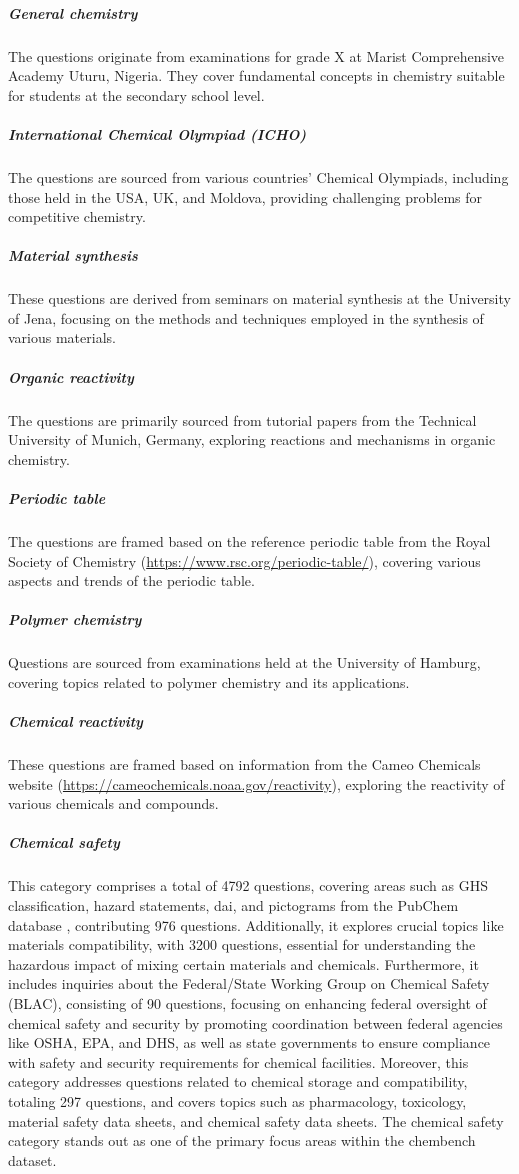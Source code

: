 \documentclass[11pt, oneside]{article}
\begin{document}
\subparagraph{General chemistry}
The questions originate from examinations for grade X at Marist Comprehensive Academy Uturu, Nigeria. They cover fundamental concepts in chemistry suitable for students at the secondary school level.

\subparagraph{International Chemical Olympiad (\gls{ICHO})}
The questions are sourced from various countries' Chemical Olympiads, including those held in the USA, UK, and Moldova, providing challenging problems for competitive chemistry.

\subparagraph{Material synthesis}
These questions are derived from seminars on material synthesis at the University of Jena, focusing on the methods and techniques employed in the synthesis of various materials.

\subparagraph{Organic reactivity}
The questions are primarily sourced from tutorial papers from the Technical University of Munich, Germany, exploring reactions and mechanisms in organic chemistry.

\subparagraph{Periodic table}
The questions are framed based on the reference periodic table from the Royal Society of Chemistry (\url{https://www.rsc.org/periodic-table/}), covering various aspects and trends of the periodic table.

\subparagraph{Polymer chemistry}
Questions are sourced from examinations held at the University of Hamburg, covering topics related to polymer chemistry and its applications.

\subparagraph{Chemical reactivity}
These questions are framed based on information from the Cameo Chemicals website (\url{https://cameochemicals.noaa.gov/reactivity}), exploring the reactivity of various chemicals and compounds.

\subparagraph{Chemical safety}
This category comprises a total of 4792 questions, covering areas such as GHS classification, hazard statements, \gls{dai}, and pictograms from the PubChem database \cite{pubchem}, contributing 976 questions. 
Additionally, it explores crucial topics like materials compatibility, with 3200 questions, essential for understanding the hazardous impact of mixing certain materials and chemicals. 
Furthermore, it includes inquiries about the Federal/State Working Group on Chemical Safety (BLAC), consisting of 90 questions, focusing on enhancing federal oversight of chemical safety and security by promoting coordination between federal agencies like OSHA, EPA, and DHS, as well as state governments to ensure compliance with safety and security requirements for chemical facilities. 
Moreover, this category addresses questions related to chemical storage and compatibility, totaling 297 questions, and covers topics such as pharmacology, toxicology, material safety data sheets, and chemical safety data sheets. The chemical safety category stands out as one of the primary focus areas within the chembench dataset.
\end{document}
